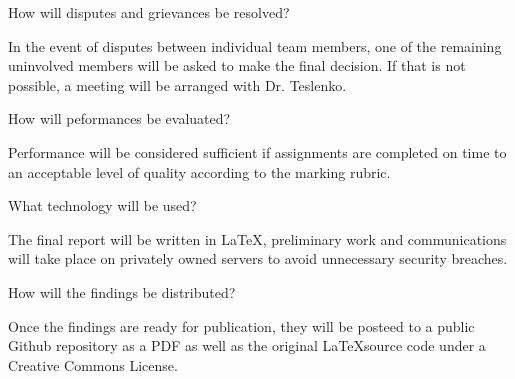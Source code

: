 \documentclass{article}
\begin{document}
	\par How will disputes and grievances be resolved?
	\begin{addmargin}[2.5em]{0em}
		In the event of disputes between individual team members, one of the remaining uninvolved members will be asked to make the final decision. If that is not possible, a meeting will be arranged with Dr. Teslenko.\\
	\end{addmargin}

	\par How will peformances be evaluated?
	\begin{addmargin}[3em]{0em}
		Performance will be considered sufficient if assignments are completed on time to an acceptable level of quality according to the marking rubric. \\
	\end{addmargin}

	\par What technology will be used? 

	\begin{addmargin}[3em]{0em}
		The final report will be written in \LaTeX, preliminary work and communications will take place on privately owned servers to avoid unnecessary security breaches.\\ 
	\end{addmargin}

	\par How will the findings be distributed?

	\begin{addmargin}[3em]{0em}
		Once the findings are ready for publication, they will be posteed to a public Github repository as a PDF as well as the original \LaTeX\space source code under a Creative Commons License.\\
	\end{addmargin}
\end{document}
